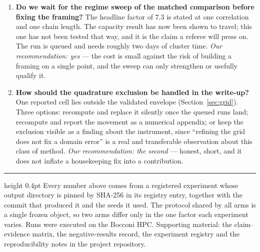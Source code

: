 \documentclass[11pt,a4paper]{article}
\newcommand{\hi}[1]{\textbf{#1}}
\begin{document}
\begin{enumerate}
\item \hi{Do we wait for the regime sweep of the matched comparison before fixing the framing?}
The headline factor of $7.3$ is stated at one correlation and one chain length. The capacity
result has now been shown to travel; this one has not been tested that way, and it is the claim a
referee will press on. The run is queued and needs roughly two days of cluster time.
\emph{Our recommendation: yes} --- the cost is small against the risk of building a framing on a
single point, and the sweep can only strengthen or usefully qualify it.

\item \hi{How should the quadrature exclusion be handled in the write-up?} One reported cell lies
outside the validated envelope (Section~\ref{sec:grid}). Three options: recompute and replace it
silently once the queued runs land; recompute and report the movement as a numerical appendix; or
keep the exclusion visible as a finding about the instrument, since ``refining the grid does not
fix a domain error'' is a real and transferable observation about this class of method.
\emph{Our recommendation: the second} --- honest, short, and it does not inflate a housekeeping
fix into a contribution.
\end{enumerate}

\vspace{1.4em}
\hrule height 0.4pt
\vspace{0.7em}
\noindent
{\footnotesize Every number above comes from a registered experiment whose output directory is
pinned by SHA-256 in its registry entry, together with the commit that produced it and the seeds it
used. The protocol shared by all arms is a single frozen object, so two arms differ only in the one
factor each experiment varies. Runs were executed on the Bocconi HPC. Supporting material: the
claim--evidence matrix, the negative-results record, the experiment registry and the
reproducibility notes in the project repository.}
\end{document}
